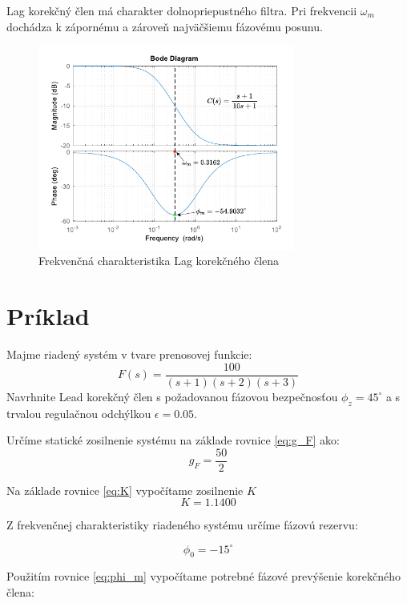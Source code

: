 \documentclass[a4paper,10pt]{article}
\begin{document}
Lag korekčný člen má charakter dolnopriepustného filtra. Pri frekvencii $\omega_m$ dochádza k zápornému a zároveň najväčšiemu fázovému posunu.
\begin{figure}[ht]
\centering
\includegraphics[width=0.75\textwidth]{LagBode}
\caption{Frekvenčná charakteristika Lag korekčného člena}
\end{figure}

\pagebreak

\section{Príklad}

Majme riadený systém v tvare prenosovej funkcie:
\begin{equation}
 F(s)=\frac{100}{(s+1)(s+2)(s+3)}
\end{equation}
Navrhnite Lead korekčný člen s požadovanou fázovou bezpečnosťou $\phi_z=45^\circ$ a s trvalou regulačnou odchýlkou $\epsilon=0.05$.

Určíme statické zosilnenie systému na základe rovnice \eqref{eq:g_F} ako:
\begin{equation}
   g_F=\frac{50}{2}
\end{equation}

Na základe rovnice \eqref{eq:K} vypočítame zosilnenie $K$
\begin{equation}
 K=1.1400
\end{equation}

Z frekvenčnej charakteristiky riadeného systému určíme fázovú rezervu:

\begin{equation}
 \phi_0=-15^\circ
\end{equation}

Použitím rovnice \eqref{eq:phi_m} vypočítame potrebné fázové prevýšenie korekčného člena:
\end{document}
